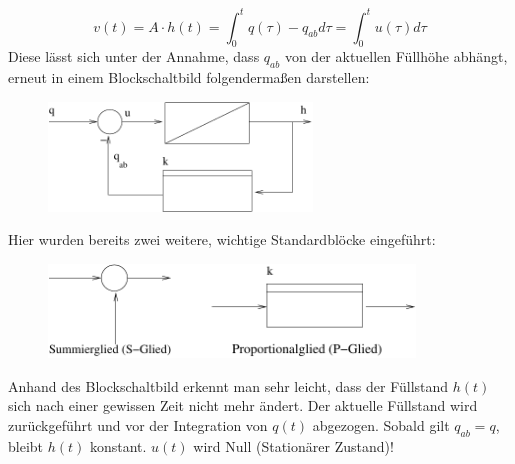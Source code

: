 \documentclass[12pt,a4paper,ngerman]{scrartcl}
\begin{document}
\begin{equation*}
 v(t)= A \cdot h(t)=\int_0^t{q(\tau)-q_{ab}d\tau}=\int_0^t{u(\tau)d\tau} 
\end{equation*}
Diese lässt sich unter der Annahme, dass $q_{ab}$ von der aktuellen Füllhöhe abhängt, erneut in einem Blockschaltbild folgendermaßen darstellen:
\begin{figure}[H]
\includegraphics[width=7cm]{sysregel_bsb2}
\end{figure}
Hier wurden bereits zwei weitere, wichtige Standardblöcke eingeführt:
\begin{figure}[H]
\includegraphics[height=2.5cm]{sysregel_spglied}
\end{figure}
Anhand des Blockschaltbild erkennt man sehr leicht, dass der Füllstand $h(t)$ sich nach einer gewissen Zeit nicht mehr ändert. Der aktuelle Füllstand wird zurückgeführt und vor der Integration von $q(t)$ abgezogen. Sobald gilt $q_{ab}=q$, bleibt $h(t)$ konstant. $u(t)$ wird Null (Stationärer Zustand)!
\end{document}
